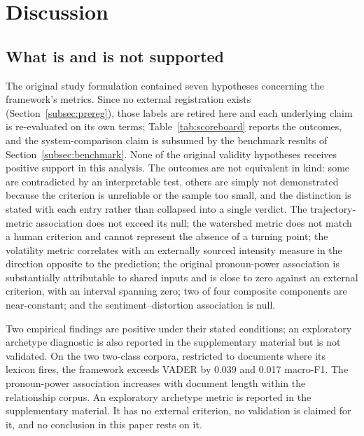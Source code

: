 \documentclass[fleqn,10pt]{wlscirep}
\begin{document}
\section{Discussion}\label{sec:discussion}

\subsection{What is and is not supported}

The original study formulation contained seven hypotheses concerning the framework's metrics. Since no external registration exists (Section~\ref{subsec:prereg}), those labels are retired here and each underlying claim is re-evaluated on its own terms; Table~\ref{tab:scoreboard} reports the outcomes, and the system-comparison claim is subsumed by the benchmark results of Section~\ref{subsec:benchmark}. None of the original validity hypotheses receives positive support in this analysis. The outcomes are not equivalent in kind: some are contradicted by an interpretable test, others are simply not demonstrated because the criterion is unreliable or the sample too small, and the distinction is stated with each entry rather than collapsed into a single verdict. The trajectory-metric association does not exceed its null; the watershed metric does not match a human criterion and cannot represent the absence of a turning point; the volatility metric correlates with an externally sourced intensity measure in the direction opposite to the prediction; the original pronoun-power association is substantially attributable to shared inputs and is close to zero against an external criterion, with an interval spanning zero; two of four composite components are near-constant; and the sentiment--distortion association is null.

Two empirical findings are positive under their stated conditions; an exploratory archetype diagnostic is also reported in the supplementary material but is not validated. On the two two-class corpora, restricted to documents where its lexicon fires, the framework exceeds VADER by 0.039 and 0.017 macro-F1. The pronoun-power association increases with document length within the relationship corpus. An exploratory archetype metric is reported in the supplementary material. It has no external criterion, no validation is claimed for it, and no conclusion in this paper rests on it.
\end{document}

